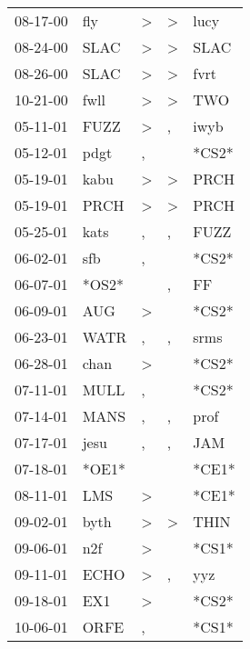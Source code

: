 \begin{supertabular}{lllll}
 08-17-00 &    fly &     \textgreater &     \textgreater &   lucy \\
 08-24-00 &   SLAC &     \textgreater &     \textgreater &   SLAC \\
 08-26-00 &   SLAC &     \textgreater &     \textgreater &   fvrt \\
 10-21-00 &   fwll &     \textgreater &     \textgreater &    TWO \\
 05-11-01 &   FUZZ &     \textgreater &                , &   iwyb \\
 05-12-01 &   pdgt &                , &                  &  *CS2* \\
 05-19-01 &   kabu &     \textgreater &     \textgreater &   PRCH \\
 05-19-01 &   PRCH &     \textgreater &     \textgreater &   PRCH \\
 05-25-01 &   kats &                , &                , &   FUZZ \\
 06-02-01 &    sfb &                , &                  &  *CS2* \\
 06-07-01 &  *OS2* &                  &                , &     FF \\
 06-09-01 &    AUG &     \textgreater &                  &  *CS2* \\
 06-23-01 &   WATR &                , &                , &   srms \\
 06-28-01 &   chan &     \textgreater &                  &  *CS2* \\
 07-11-01 &   MULL &                , &                  &  *CS2* \\
 07-14-01 &   MANS &                , &                , &   prof \\
 07-17-01 &   jesu &                , &                , &    JAM \\
 07-18-01 &  *OE1* &                  &                  &  *CE1* \\
 08-11-01 &    LMS &     \textgreater &                  &  *CE1* \\
 09-02-01 &   byth &     \textgreater &     \textgreater &   THIN \\
 09-06-01 &    n2f &     \textgreater &                  &  *CS1* \\
 09-11-01 &   ECHO &     \textgreater &                , &    yyz \\
 09-18-01 &    EX1 &     \textgreater &                  &  *CS2* \\
 10-06-01 &   ORFE &                , &                  &  *CS1* \\

\end{supertabular}
